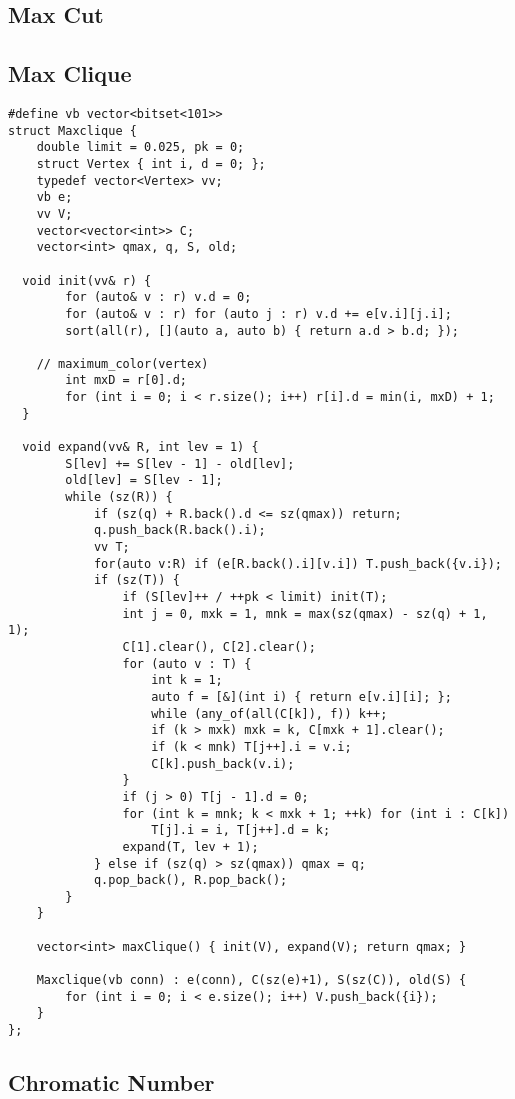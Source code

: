 \newpage
\subsection{Max Cut}

\subsection{Max Clique}

\begin{lstlisting}
#define vb vector<bitset<101>>
struct Maxclique {
	double limit = 0.025, pk = 0;
	struct Vertex { int i, d = 0; };
	typedef vector<Vertex> vv;
	vb e;
	vv V;
	vector<vector<int>> C;
	vector<int> qmax, q, S, old;
	
  void init(vv& r) {
		for (auto& v : r) v.d = 0;
		for (auto& v : r) for (auto j : r) v.d += e[v.i][j.i];
		sort(all(r), [](auto a, auto b) { return a.d > b.d; });

    // maximum_color(vertex)
		int mxD = r[0].d;
		for (int i = 0; i < r.size(); i++) r[i].d = min(i, mxD) + 1;
  }
	
  void expand(vv& R, int lev = 1) {
		S[lev] += S[lev - 1] - old[lev];
		old[lev] = S[lev - 1];
		while (sz(R)) {
			if (sz(q) + R.back().d <= sz(qmax)) return;
			q.push_back(R.back().i);
			vv T;
			for(auto v:R) if (e[R.back().i][v.i]) T.push_back({v.i});
			if (sz(T)) {
				if (S[lev]++ / ++pk < limit) init(T);
				int j = 0, mxk = 1, mnk = max(sz(qmax) - sz(q) + 1, 1);
				C[1].clear(), C[2].clear();
				for (auto v : T) {
					int k = 1;
					auto f = [&](int i) { return e[v.i][i]; };
					while (any_of(all(C[k]), f)) k++;
					if (k > mxk) mxk = k, C[mxk + 1].clear();
					if (k < mnk) T[j++].i = v.i;
					C[k].push_back(v.i);
				}
				if (j > 0) T[j - 1].d = 0;
				for (int k = mnk; k < mxk + 1; ++k) for (int i : C[k])
					T[j].i = i, T[j++].d = k;
				expand(T, lev + 1);
			} else if (sz(q) > sz(qmax)) qmax = q;
			q.pop_back(), R.pop_back();
		}
	}

	vector<int> maxClique() { init(V), expand(V); return qmax; }

	Maxclique(vb conn) : e(conn), C(sz(e)+1), S(sz(C)), old(S) {
		for (int i = 0; i < e.size(); i++) V.push_back({i});
	}
};

\end{lstlisting}

\subsection{Chromatic Number}
